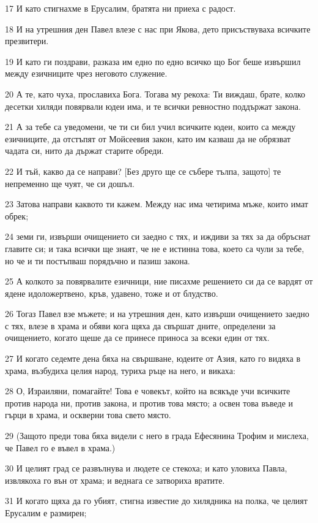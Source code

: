 \par 17 И като стигнахме в Ерусалим, братята ни приеха с радост.
\par 18 И на утрешния ден Павел влезе с нас при Якова, дето присъствуваха всичките презвитери.
\par 19 И като ги поздрави, разказа им едно по едно всичко що Бог беше извършил между езичниците чрез неговото служение.
\par 20 А те, като чуха, прославиха Бога. Тогава му рекоха: Ти виждаш, брате, колко десетки хиляди повярвали юдеи има, и те всички ревностно поддържат закона.
\par 21 А за тебе са уведомени, че ти си бил учил всичките юдеи, които са между езичниците, да отстъпят от Мойсеевия закон, като им казваш да не обрязват чадата си, нито да държат старите обреди.
\par 22 И тъй, какво да се направи? [Без друго ще се събере тълпа, защото] те непременно ще чуят, че си дошъл.
\par 23 Затова направи каквото ти кажем. Между нас има четирима мъже, които имат обрек;
\par 24 земи ги, извърши очищението си заедно с тях, и иждиви за тях за да обръснат главите си; и така всички ще знаят, че не е истинна това, което са чули за тебе, но че и ти постъпваш порядъчно и пазиш закона.
\par 25 А колкото за повярвалите езичници, ние писахме решението си да се вардят от ядене идоложертвено, кръв, удавено, тоже и от блудство.
\par 26 Тогаз Павел взе мъжете; и на утрешния ден, като извърши очищението заедно с тях, влезе в храма и обяви кога щяха да свършат дните, определени за очищението, когато щеше да се принесе приноса за всеки един от тях.
\par 27 И когато седемте дена бяха на свършване, юдеите от Азия, като го видяха в храма, възбудиха целия народ, туриха ръце на него, и викаха:
\par 28 О, Израиляни, помагайте! Това е човекът, който на всякъде учи всичките против народа ни, против закона, и против това място; а освен това въведе и гърци в храма, и оскверни това свето място.
\par 29 (Защото преди това бяха видели с него в града Ефесянина Трофим и мислеха, че Павел го е въвел в храма.)
\par 30 И целият град се развълнува и людете се стекоха; и като уловиха Павла, извлякоха го вън от храма; и веднага се затвориха вратите.
\par 31 И когато щяха да го убият, стигна известие до хилядника на полка, че целият Ерусалим е размирен;
